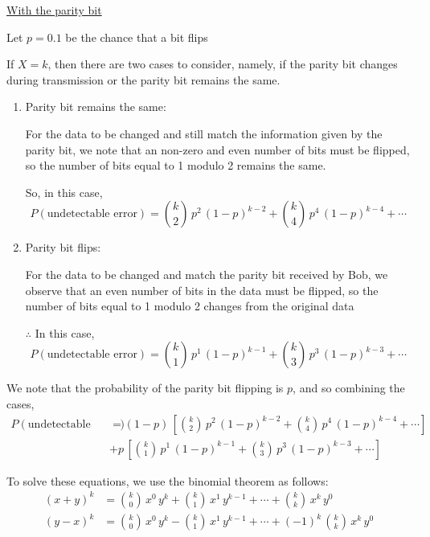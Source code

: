 \documentclass[12pt, oneside]{article}
\begin{document}
\begin{enumerate}
{    \underline{With the parity bit}

    Let \(p = 0.1\) be the chance that a bit flips

    If \(X = k\), then there are two cases to consider, namely, if the parity bit changes
    during transmission or the parity bit remains the same.

    \begin{enumerate}
        \item {
            Parity bit remains the same:

            For the data to be changed and still match the information given by the parity bit,
            we note that an non-zero and even number of bits must be flipped, so the number of
            bits equal to 1 modulo 2 remains the same.

            So, in this case,
            \[
                P(\text{undetectable error}) = {k \choose 2}\,p^2\,(1-p)^{k-2} + {k \choose 4}\,p^4\,(1-p)^{k-4} + \cdots
            \]
        }
        \item {
            Parity bit flips:

            For the data to be changed and match the parity bit received by Bob, we observe that
            an even number of bits in the data must be flipped, so the number of bits equal to 1
            modulo 2 changes from the original data

            \(\therefore\) In this case,
            \[
                P(\text{undetectable error}) = {k \choose 1}\,p^1\,(1-p)^{k-1} + {k \choose 3}\,p^3\,(1-p)^{k-3} + \cdots
            \]
        }
    \end{enumerate}

    We note that the probability of the parity bit flipping is \(p\), and so combining the cases,
    \begin{align}
        P(\text{undetectable error}) &= (1 - p) \,
            \left[{k \choose 2}\,p^2\,(1-p)^{k-2} + {k \choose 4}\,p^4\,(1-p)^{k-4} + \cdots\right] \nonumber \\
            &+ p \,
            \left[{k \choose 1}\,p^1\,(1-p)^{k-1} + {k \choose 3}\,p^3\,(1-p)^{k-3} + \cdots\right]
            \label{eq:1}
    \end{align}

    To solve these equations, we use the binomial theorem as follows:
    \begin{align*}
        (x + y)^k &= {k \choose 0}\,x^0\,y^k + {k \choose 1}\,x^1\,y^{k-1} + \cdots + {k \choose k}\,x^k\,y^0 \\
        (y - x)^k &= {k \choose 0}\,x^0\,y^k - {k \choose 1}\,x^1\,y^{k-1} + \cdots + (-1)^k \, {k \choose k}\,x^k\,y^0 
    \end{align*}

}
\end{enumerate}
\end{document}
